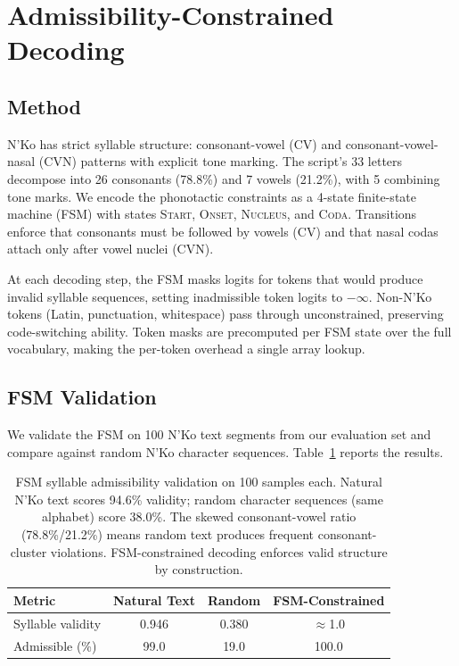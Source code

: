 \documentclass[11pt]{article}
\begin{document}
\section{Admissibility-Constrained Decoding}
\label{sec:admissibility}

\subsection{Method}

N'Ko has strict syllable structure: consonant-vowel (CV) and consonant-vowel-nasal (CVN) patterns with explicit tone marking.
The script's 33 letters decompose into 26 consonants (78.8\%) and 7 vowels (21.2\%), with 5 combining tone marks.
We encode the phonotactic constraints as a 4-state finite-state machine (FSM) with states \textsc{Start}, \textsc{Onset}, \textsc{Nucleus}, and \textsc{Coda}.
Transitions enforce that consonants must be followed by vowels (CV) and that nasal codas attach only after vowel nuclei (CVN).

At each decoding step, the FSM masks logits for tokens that would produce invalid syllable sequences, setting inadmissible token logits to $-\infty$.
Non-N'Ko tokens (Latin, punctuation, whitespace) pass through unconstrained, preserving code-switching ability.
Token masks are precomputed per FSM state over the full vocabulary, making the per-token overhead a single array lookup.

\subsection{FSM Validation}

We validate the FSM on 100 N'Ko text segments from our evaluation set and compare against random N'Ko character sequences.
Table~\ref{tab:admissibility} reports the results.

\begin{table}[t]
\centering
\small
\begin{tabular}{lccc}
\toprule
\textbf{Metric} & \textbf{Natural Text} & \textbf{Random} & \textbf{FSM-Constrained} \\
\midrule
Syllable validity & 0.946 & 0.380 & $\approx$1.0 \\
Admissible (\%) & 99.0 & 19.0 & 100.0 \\
\bottomrule
\end{tabular}
\caption{FSM syllable admissibility validation on 100 samples each. Natural N'Ko text scores 94.6\% validity; random character sequences (same alphabet) score 38.0\%. The skewed consonant-vowel ratio (78.8\%/21.2\%) means random text produces frequent consonant-cluster violations. FSM-constrained decoding enforces valid structure by construction.}
\label{tab:admissibility}
\end{table}
\end{document}
